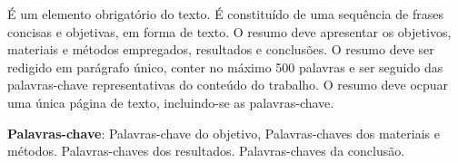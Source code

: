 
\noindent%
É um elemento obrigatório do texto. É constituído de uma sequência de frases concisas e objetivas, em forma de texto.
O resumo deve apresentar os objetivos, materiais e métodos empregados, resultados e conclusões. 
O resumo deve ser redigido em parágrafo único, conter no máximo 500 palavras e ser seguido das palavras-chave  representativas do conteúdo do trabalho. O resumo deve ocpuar uma única página de texto, incluindo-se as palavras-chave.
\vfill

\noindent 
\textbf{Palavras-chave}: Palavras-chave do objetivo, Palavras-chaves dos materiais e métodos. Palavras-chaves dos resultados. Palavras-chaves da conclusão.
